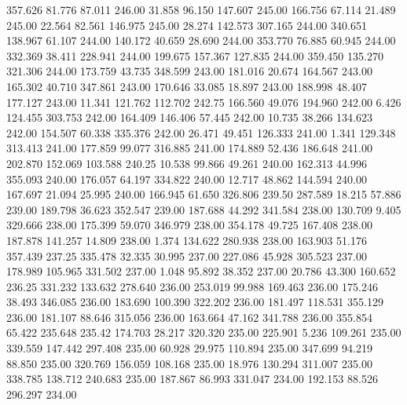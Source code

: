  357.626   81.776   87.011       246.00
  31.858   96.150  147.607       245.00
 166.756   67.114   21.489       245.00
  22.564   82.561  146.975       245.00
  28.274  142.573  307.165       244.00
 340.651  138.967   61.107       244.00
 140.172   40.659   28.690       244.00
 353.770   76.885   60.945       244.00
 332.369   38.411  228.941       244.00
 199.675  157.367  127.835       244.00
 359.450  135.270  321.306       244.00
 173.759   43.735  348.599       243.00
 181.016   20.674  164.567       243.00
 165.302   40.710  347.861       243.00
 170.646   33.085   18.897       243.00
 188.998   48.407  177.127       243.00
  11.341  121.762  112.702       242.75
 166.560   49.076  194.960       242.00
   6.426  124.455  303.753       242.00
 164.409  146.406   57.445       242.00
  10.735   38.266  134.623       242.00
 154.507   60.338  335.376       242.00
  26.471   49.451  126.333       241.00
   1.341  129.348  313.413       241.00
 177.859   99.077  316.885       241.00
 174.889   52.436  186.648       241.00
 202.870  152.069  103.588       240.25
  10.538   99.866   49.261       240.00
 162.313   44.996  355.093       240.00
 176.057   64.197  334.822       240.00
  12.717   48.862  144.594       240.00
 167.697   21.094   25.995       240.00
 166.945   61.650  326.806       239.50
 287.589   18.215   57.886       239.00
 189.798   36.623  352.547       239.00
 187.688   44.292  341.584       238.00
 130.709    9.405  329.666       238.00
 175.399   59.070  346.979       238.00
 354.178   49.725  167.408       238.00
 187.878  141.257   14.809       238.00
   1.374  134.622  280.938       238.00
 163.903   51.176  357.439       237.25
 335.478   32.335   30.995       237.00
 227.086   45.928  305.523       237.00
 178.989  105.965  331.502       237.00
   1.048   95.892   38.352       237.00
  20.786   43.300  160.652       236.25
 331.232  133.632  278.640       236.00
 253.019   99.988  169.463       236.00
 175.246   38.493  346.085       236.00
 183.690  100.390  322.202       236.00
 181.497  118.531  355.129       236.00
 181.107   88.646  315.056       236.00
 163.664   47.162  341.788       236.00
 355.854   65.422  235.648       235.42
 174.703   28.217  320.320       235.00
 225.901    5.236  109.261       235.00
 339.559  147.442  297.408       235.00
  60.928   29.975  110.894       235.00
 347.699   94.219   88.850       235.00
 320.769  156.059  108.168       235.00
  18.976  130.294  311.007       235.00
 338.785  138.712  240.683       235.00
 187.867   86.993  331.047       234.00
 192.153   88.526  296.297       234.00
